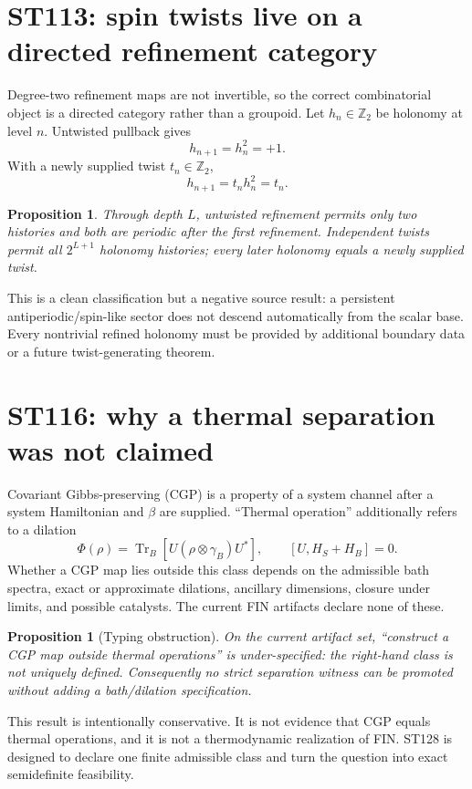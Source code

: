 \documentclass[11pt,a4paper]{article}
\newtheorem{proposition}[theorem]{Proposition}
\begin{document}
\section{ST113: spin twists live on a directed refinement category}

Degree-two refinement maps are not invertible, so the correct combinatorial object is a directed category rather than a groupoid. Let $h_n\in\mathbb Z_2$ be holonomy at level $n$. Untwisted pullback gives
\[
h_{n+1}=h_n^2=+1.
\]
With a newly supplied twist $t_n\in\mathbb Z_2$,
\[
h_{n+1}=t_nh_n^2=t_n.
\]

\begin{proposition}
Through depth $L$, untwisted refinement permits only two histories and both are periodic after the first refinement. Independent twists permit all $2^{L+1}$ holonomy histories; every later holonomy equals a newly supplied twist.
\end{proposition}

This is a clean classification but a negative source result: a persistent antiperiodic/spin-like sector does not descend automatically from the scalar base. Every nontrivial refined holonomy must be provided by additional boundary data or a future twist-generating theorem.

\section{ST116: why a thermal separation was not claimed}

Covariant Gibbs-preserving (CGP) is a property of a system channel after a system Hamiltonian and $\beta$ are supplied. ``Thermal operation'' additionally refers to a dilation
\[
\Phi(\rho)=\operatorname{Tr}_B\!\left[U(\rho\otimes\gamma_B)U^*\right],
\qquad[U,H_S+H_B]=0.
\]
Whether a CGP map lies outside this class depends on the admissible bath spectra, exact or approximate dilations, ancillary dimensions, closure under limits, and possible catalysts. The current FIN artifacts declare none of these.

\begin{proposition}[Typing obstruction]
On the current artifact set, ``construct a CGP map outside thermal operations'' is under-specified: the right-hand class is not uniquely defined. Consequently no strict separation witness can be promoted without adding a bath/dilation specification.
\end{proposition}

This result is intentionally conservative. It is not evidence that CGP equals thermal operations, and it is not a thermodynamic realization of FIN. ST128 is designed to declare one finite admissible class and turn the question into exact semidefinite feasibility.
\end{document}
